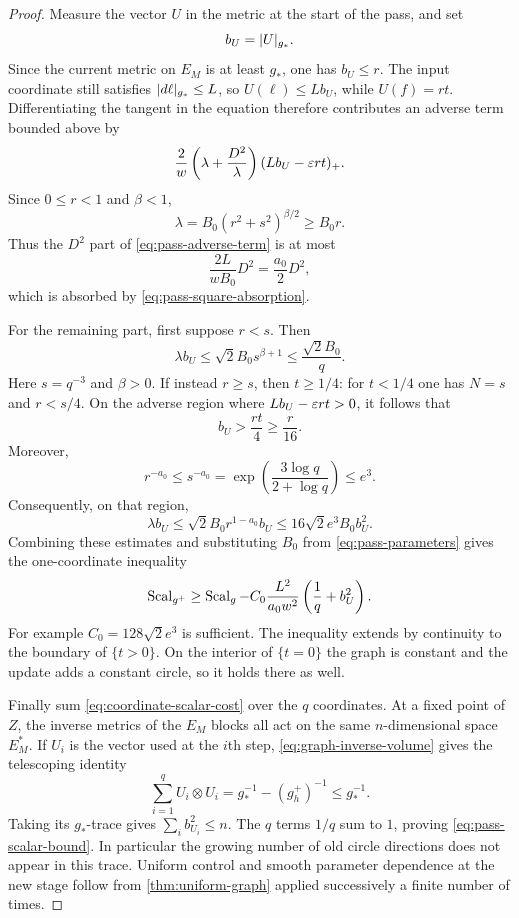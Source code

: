 \begin{proof}
Measure the vector $U$ in the metric at the start of the pass, and set
\[
 b_U=\lvert U\rvert_{g_*}.
\]
Since the current metric on $E_M$ is at least $g_*$, one has $b_U\le r$.
The input coordinate still satisfies $\lvert d\ell\rvert_{g_*}\le L$, so
$U(\ell)\le Lb_U$, while $U(f)=rt$. Differentiating the tangent in the
equation therefore contributes an adverse term bounded above by
\begin{equation}\label{eq:pass-adverse-term}
 \frac2w\left(\lambda+\frac{D^2}{\lambda}\right)
                      (Lb_U-\varepsilon rt)_+.
\end{equation}
Since $0\le r<1$ and $\beta<1$,
\[
 \lambda=B_0(r^2+s^2)^{\beta/2}\ge B_0r.
\]
Thus the $D^2$ part of \eqref{eq:pass-adverse-term} is at most
\[
 \frac{2L}{wB_0}D^2=\frac{a_0}{2}D^2,
\]
which is absorbed by \eqref{eq:pass-square-absorption}.

For the remaining part, first suppose $r<s$. Then
\begin{equation}\label{eq:pass-small-slope}
 \lambda b_U\le \sqrt2 B_0s^{\beta+1}\le\frac{\sqrt2 B_0}{q}.
\end{equation}
Here $s=q^{-3}$ and $\beta>0$. If instead $r\ge s$, then $t\ge1/4$: for $t<1/4$ one has $N=s$ and $r< s/4$. On the adverse region where $Lb_U-\varepsilon rt>0$, it follows that
\[
 b_U>\frac{rt}{4}\ge\frac r{16}.
\]
Moreover,
\[
 r^{-a_0}\le s^{-a_0}
       =\exp\left(\frac{3\log q}{2+\log q}\right)\le e^3.
\]
Consequently, on that region,
\begin{equation}\label{eq:pass-large-slope}
 \lambda b_U\le\sqrt2 B_0r^{1-a_0}b_U
            \le16\sqrt2 e^3B_0b_U^2.
\end{equation}
Combining these estimates and substituting $B_0$ from \eqref{eq:pass-parameters} gives the one-coordinate inequality
\begin{equation}\label{eq:coordinate-scalar-cost}
 \operatorname{Scal}_{g^+}\ge\operatorname{Scal}_g
      -C_0\frac{L^2}{a_0w^2}\left(\frac1q+b_U^2\right).
\end{equation}
For example $C_0=128\sqrt2 e^3$ is sufficient. The inequality extends by continuity to the boundary of $\{t>0\}$. On the interior of $\{t=0\}$ the graph is constant and the update adds a constant circle, so it holds there as well.

Finally sum \eqref{eq:coordinate-scalar-cost} over the $q$ coordinates.
At a fixed point of $Z$, the inverse metrics of the $E_M$ blocks all act
on the same $n$-dimensional space $E_M^*$. If $U_i$ is the vector used at the $i$th
step, \eqref{eq:graph-inverse-volume} gives the telescoping identity
\begin{equation}\label{eq:pass-trace-telescope}
 \sum_{i=1}^q U_i\otimes U_i
       =g_*^{-1}-(g_h^+)^{-1}\le g_*^{-1}.
\end{equation}
Taking its $g_*$-trace gives $\sum_i b_{U_i}^2\le n$. The $q$ terms $1/q$ sum to $1$, proving \eqref{eq:pass-scalar-bound}. In particular the growing number of old circle directions does not appear in this trace. Uniform control and smooth parameter dependence at the new stage follow from \cref{thm:uniform-graph} applied successively a finite number of times.
\end{proof}

